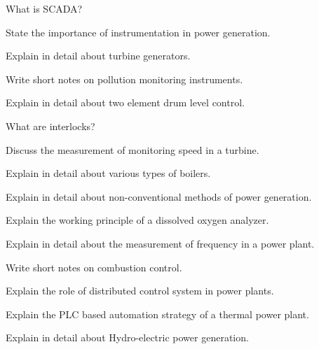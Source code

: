 \item What is SCADA?

\markA
\partB


\item State the importance of instrumentation in power generation.

\item Explain in detail about turbine generators.

\item Write short notes on pollution monitoring instruments.

\item Explain in detail about two element drum level control.

\item What are interlocks?

\item Discuss the measurement of monitoring speed in a turbine.



\markB

\partC

\item \iitem Explain in detail about various types of boilers.

\Or

\item Explain in detail about non-conventional methods of power generation.

\ene

\newpage \again

\item \iitem Explain the working principle of a dissolved oxygen analyzer.

\Or

\item Explain in detail about the  measurement of frequency in a power plant.

\ene


\item \iitem Write short notes on combustion control.

\Or

\item Explain the role of distributed control system in power plants.

\ene

\item \iitem Explain the PLC based automation strategy of a thermal power plant.

\Or

\item Explain in detail about Hydro-electric power generation.

\ene

\markC

\ene




